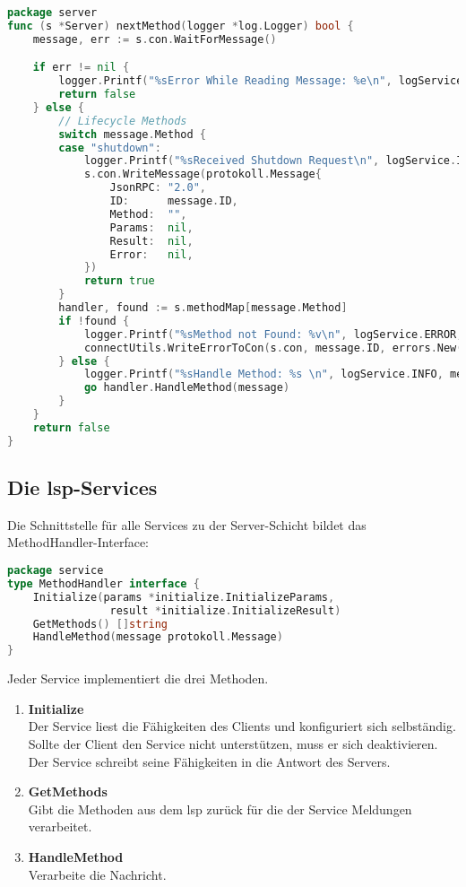 \documentclass[./einleitung.tex]{subfiles}
\begin{document}
    \begin{lstlisting}[language=Go, caption=Verarbeitung einer Nachricht, label=lst:handleMethod]
package server
func (s *Server) nextMethod(logger *log.Logger) bool {
	message, err := s.con.WaitForMessage()

	if err != nil {
		logger.Printf("%sError While Reading Message: %e\n", logService.ERROR, err)
		return false
	} else {
		// Lifecycle Methods
		switch message.Method {
		case "shutdown":
			logger.Printf("%sReceived Shutdown Request\n", logService.INFO)
			s.con.WriteMessage(protokoll.Message{
				JsonRPC: "2.0",
				ID:      message.ID,
				Method:  "",
				Params:  nil,
				Result:  nil,
				Error:   nil,
			})
			return true
		}
		handler, found := s.methodMap[message.Method]
		if !found {
			logger.Printf("%sMethod not Found: %v\n", logService.ERROR, message)
			connectUtils.WriteErrorToCon(s.con, message.ID, errors.New("method not found"), protokoll.MethodNotFound)
		} else {
			logger.Printf("%sHandle Method: %s \n", logService.INFO, message.Method)
			go handler.HandleMethod(message)
		}
	}
	return false
}
    \end{lstlisting}
    \subsection{Die \acrshort{lsp}-Services}
    Die Schnittstelle für alle Services zu der Server-Schicht bildet das MethodHandler-Interface:
    \begin{lstlisting}[language=Go]
package service
type MethodHandler interface {
	Initialize(params *initialize.InitializeParams,
                result *initialize.InitializeResult)
	GetMethods() []string
	HandleMethod(message protokoll.Message)
}
    \end{lstlisting}
    Jeder Service implementiert die drei Methoden.
    \begin{enumerate}
        \item \textbf{Initialize} \\
        Der Service liest die Fähigkeiten des Clients und konfiguriert sich selbständig.
        Sollte der Client den Service nicht unterstützen, muss er sich deaktivieren.
        Der Service schreibt seine Fähigkeiten in die Antwort des Servers.
        \item \textbf{GetMethods} \\
        Gibt die Methoden aus dem \acrshort{lsp} zurück für die der Service Meldungen verarbeitet.
        \item \textbf{HandleMethod} \\
        Verarbeite die Nachricht.
    \end{enumerate}
\end{document}
